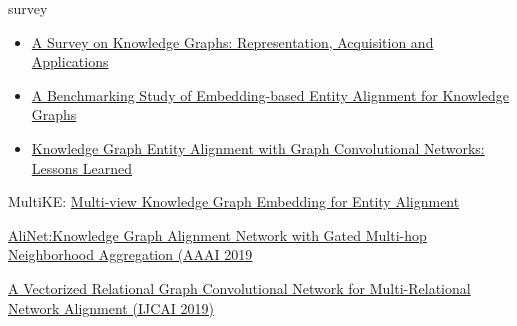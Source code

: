     \begin{todolist}
      \item[\done] survey
        \begin{itemize}
            \item  \href{https://arxiv.org/pdf/2002.00388.pdf}{A Survey on Knowledge Graphs:
Representation, Acquisition and Applications} 
            \item  \href{https://arxiv.org/pdf/2003.07743.pdf}{A Benchmarking Study of
Embedding-based Entity Alignment for Knowledge Graphs}
            \item \href{https://arxiv.org/pdf/1911.08342.pdf}{Knowledge Graph Entity Alignment with Graph
Convolutional Networks: Lessons Learned}
        \end{itemize}
      \item MultiKE: \href{https://arxiv.org/pdf/1906.02390.pdf}{Multi-view Knowledge Graph Embedding for Entity Alignment} %
      \item[\done] \href{https://arxiv.org/pdf/1911.08936.pdf }{AliNet:Knowledge Graph Alignment Network with Gated Multi-hop
Neighborhood Aggregation (AAAI 2019}    %
      \item \href{https://www.ijcai.org/Proceedings/2019/0574.pdf}{A Vectorized Relational Graph Convolutional Network for Multi-Relational Network Alignment (IJCAI 2019)}  %
      
      \end{todolist}

